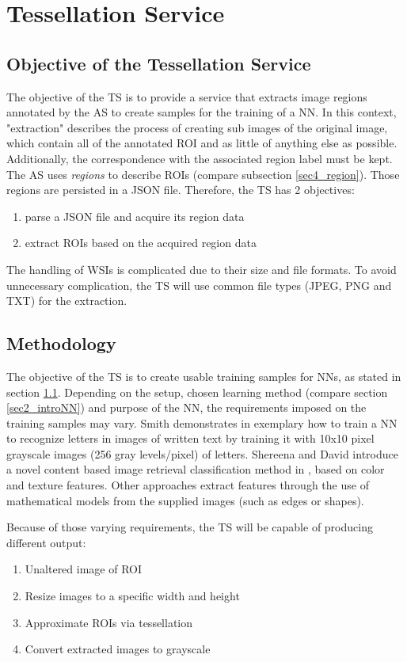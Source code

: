 \chapter{Tessellation Service}
\label{sec5}
\section{Objective of the Tessellation Service}
\label{sec5_objective}
The objective of the TS is to provide a service that extracts image regions annotated by the AS to create samples for the training of a NN. In this context, "extraction" describes the process of creating sub images of the original image, which contain all of the annotated ROI and as little of anything else as possible. Additionally, the correspondence with the associated region label must be kept. The AS uses \emph{regions} to describe ROIs (compare subsection \ref{sec4_region}). Those regions are persisted in a JSON file. Therefore, the TS has 2 objectives:
\begin{enumerate}[(1)]
	\item parse a JSON file and acquire its region data
	\item extract ROIs based on the acquired region data
\end{enumerate}

The handling of WSIs is complicated due to their size and file formats. To avoid unnecessary complication, the TS will use common file types (JPEG, PNG and TXT) for the extraction.


\section{Methodology}
\label{sec5_method}
The objective of the TS is to create usable training samples for NNs, as stated in section \ref{sec5_objective}. Depending on the setup, chosen learning method (compare section \ref{sec2_introNN}) and purpose of the NN, the requirements imposed on the training samples may vary. Smith demonstrates in \cite{Smith97} exemplary how to train a NN to recognize letters in images of written text by training it with 10x10 pixel grayscale images (256 gray levels/pixel) of letters. Shereena and David introduce a novel content based image retrieval classification method in \cite{Shereena14}, based on color and texture features. Other approaches extract features through the use of mathematical models from the supplied images (such as edges or shapes)\cite{Harvey91}.
\clearpage

Because of those varying requirements, the TS will be capable of producing different output:
\begin{enumerate}[(1)]
	\item Unaltered image of ROI
	\item Resize images to a specific width and height
	\item Approximate ROIs via tessellation
	\item Convert extracted images to grayscale
\end{enumerate}

